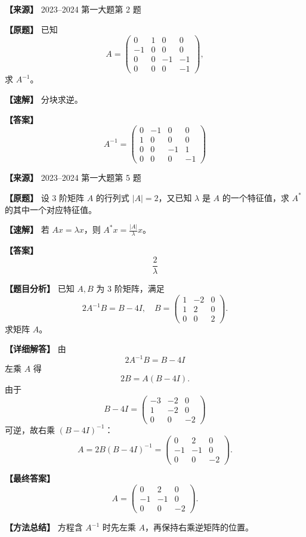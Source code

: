 \documentclass[11pt,a4paper,UTF8]{ctexart}
\begin{document}
\begin{answerbox}
\textbf{【来源】} 2023--2024 第一大题第 2 题

\textbf{【原题】}
已知
\[
A=\begin{pmatrix}
0&1&0&0\\
-1&0&0&0\\
0&0&-1&-1\\
0&0&0&-1
\end{pmatrix},
\]
求 $A^{-1}$。

\textbf{【速解】}
分块求逆。

\textbf{【答案】}
\[A^{-1}=\begin{pmatrix}0&-1&0&0\\1&0&0&0\\0&0&-1&1\\0&0&0&-1\end{pmatrix}\]
\end{answerbox}

\begin{answerbox}
\textbf{【来源】} 2023--2024 第一大题第 5 题

\textbf{【原题】}
设 $3$ 阶矩阵 $A$ 的行列式 $|A|=2$，又已知 $\lambda$ 是 $A$ 的一个特征值，求 $A^*$ 的其中一个对应特征值。

\textbf{【速解】}
若 $Ax=\lambda x$，则 $A^*x=\frac{|A|}{\lambda}x$。

\textbf{【答案】}
\[\frac{2}{\lambda}\]
\end{answerbox}

\begin{answerbox}
\textbf{【题目分析】} 已知 $A,B$ 为 $3$ 阶矩阵，满足
\[
2A^{-1}B=B-4I,
\quad
B=\begin{pmatrix}1&-2&0\\1&2&0\\0&0&2\end{pmatrix}.
\]
求矩阵 $A$。

\textbf{【详细解答】} 由
\[
2A^{-1}B=B-4I
\]
左乘 $A$ 得
\[
2B=A(B-4I).
\]
由于
\[
B-4I=\begin{pmatrix}-3&-2&0\\1&-2&0\\0&0&-2\end{pmatrix}
\]
可逆，故右乘 $(B-4I)^{-1}$：
\[
A=2B(B-4I)^{-1}
=\begin{pmatrix}0&2&0\\-1&-1&0\\0&0&-2\end{pmatrix}.
\]

\textbf{【最终答案】}
\[
A=\begin{pmatrix}0&2&0\\-1&-1&0\\0&0&-2\end{pmatrix}.
\]

\textbf{【方法总结】} 方程含 $A^{-1}$ 时先左乘 $A$，再保持右乘逆矩阵的位置。
\end{answerbox}
\end{document}
